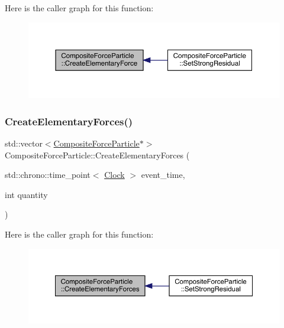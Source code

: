 Here is the caller graph for this function\+:\nopagebreak
\begin{figure}[H]
\begin{center}
\leavevmode
\includegraphics[width=350pt]{class_composite_force_particle_a490b3eed8b9dbcc3edf44a9747ef6dbb_icgraph}
\end{center}
\end{figure}
\mbox{\label{class_composite_force_particle_a56e006b0aa4b54401db763782294de62}} 
\subsubsection{\texorpdfstring{Create\+Elementary\+Forces()}{CreateElementaryForces()}}
{\footnotesize\ttfamily std\+::vector$<$\hyperlink{class_composite_force_particle}{Composite\+Force\+Particle}$\ast$$>$ Composite\+Force\+Particle\+::\+Create\+Elementary\+Forces (\begin{DoxyParamCaption}\item[{std\+::chrono\+::time\+\_\+point$<$ \hyperlink{universe_8h_a0ef8d951d1ca5ab3cfaf7ab4c7a6fd80}{Clock} $>$}]{event\+\_\+time,  }\item[{int}]{quantity }\end{DoxyParamCaption})}

Here is the caller graph for this function\+:\nopagebreak
\begin{figure}[H]
\begin{center}
\leavevmode
\includegraphics[width=350pt]{class_composite_force_particle_a56e006b0aa4b54401db763782294de62_icgraph}
\end{center}
\end{figure}
\mbox{\label{class_composite_force_particle_a0806069e389e30c63572c4cd6b9776d7}} 
